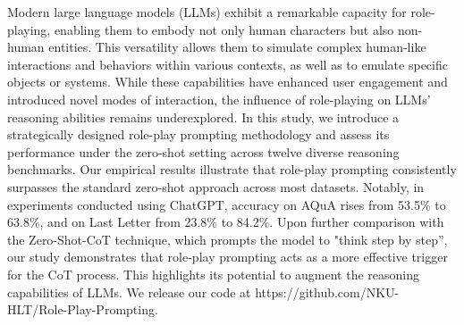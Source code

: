 Modern large language models (LLMs) exhibit a remarkable capacity for role-playing, enabling them to embody not only human characters but also non-human entities. This versatility allows them to simulate complex human-like interactions and behaviors within various contexts, as well as to emulate specific objects or systems. While these capabilities have enhanced user engagement and introduced novel modes of interaction, the influence of role-playing on LLMs' reasoning abilities remains underexplored. In this study, we introduce a strategically designed role-play prompting methodology and assess its performance under the zero-shot setting across twelve diverse reasoning benchmarks. Our empirical results illustrate that role-play prompting consistently surpasses the standard zero-shot approach across most datasets. Notably, in experiments conducted using ChatGPT, accuracy on AQuA rises from 53.5\% to 63.8\%, and on Last Letter from 23.8\% to 84.2\%. Upon further comparison with the Zero-Shot-CoT technique, which prompts the model to "think step by step'', our study demonstrates that role-play prompting acts as a more effective trigger for the CoT process. This highlights its potential to augment the reasoning capabilities of LLMs. We release our code at https://github.com/NKU-HLT/Role-Play-Prompting.